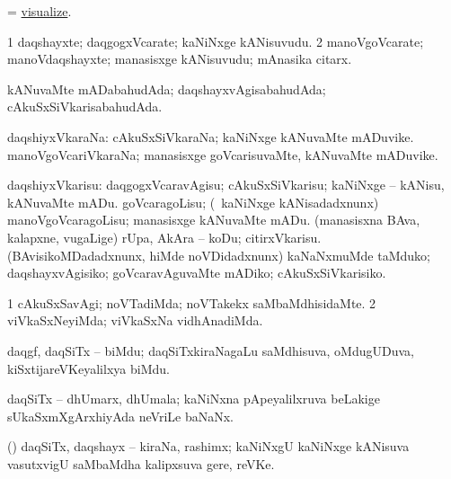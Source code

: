 \bentry 
{} 
\gl{\sakirx}
\expl{}
\bmng
 = \hyperlink{visualize}{visualize}. 
\emng
\eentry

\bentry
{} 
\gl{\nA}
\expl{}
\bmng
\bnum
\num{1} daqshayxte; daqgogxVcarate; kaNiNxge kANisuvudu. 
\num{2} manoVgoVcarate; manoVdaqshayxte; manasisxge kANisuvudu; mAnasika citarx. 
\enum
\emng
\eentry

\bentry
{} 
\gl{\gu}
\expl{}
\bmng
 kANuvaMte mADabahudAda; daqshayxvAgisabahudAda; cAkuSxSiVkarisabahudAda. 
\emng
\eentry

\bentry
{} 
\gl{\nA}
\expl{}
\bmng
 daqshiyxVkaraNa: 
\banum
{} cAkuSxSiVkaraNa; kaNiNxge kANuvaMte mADuvike. 
 manoVgoVcariVkaraNa; manasisxge goVcarisuvaMte, kANuvaMte mADuvike. 
\eanum
\emng
\eentry

\bentry 
{} 
\gl{\sakirx}
\expl{}
\bmng
 daqshiyxVkarisu: 
\banum
{} daqgogxVcaravAgisu; cAkuSxSiVkarisu; kaNiNxge -- kANisu, kANuvaMte mADu. 
 goVcaragoLisu; (\kanmu\ kaNiNxge kANisadadxnunx) manoVgoVcaragoLisu; manasisxge kANuvaMte mADu. 
 (manasisxna BAva, kalapxne, \mo vugaLige) rUpa, AkAra -- koDu; citirxVkarisu. 
 (BAvisikoMDadadxnunx, hiMde noVDidadxnunx) kaNaNxmuMde taMduko; daqshayxvAgisiko; goVcaravAguvaMte mADiko; cAkuSxSiVkarisiko. 
\eanum
\emng
\eentry

\bentry
{} 
\gl{\kirxvi}
\expl{}
\bmng
\bnum
\num{1} cAkuSxSavAgi; noVTadiMda; noVTakekx saMbaMdhisidaMte. 
\num{2} viVkaSxNeyiMda; viVkaSxNa vidhAnadiMda. 
\enum
\emng
\eentry

\bentry 
{}
\gl{\nA}
\expl{}
\bmng
 daqgf, daqSiTx -- biMdu; daqSiTxkiraNagaLu saMdhisuva, oMdugUDuva, kiSxtijareVKeyalilxya biMdu. 
\emng
\eentry

\bentry 
{}
\gl{\nA}
\expl{}
\bmng
 daqSiTx -- dhUmarx, dhUmala; kaNiNxna pApeyalilxruva beLakige sUkaSxmXgArxhiyAda neVriLe baNaNx. 
\emng
\eentry

\bentry 
{}
\gl{\nA}
\expl{}
\bmng
 (\daqvi) daqSiTx, daqshayx -- kiraNa, rashimx; kaNiNxgU kaNiNxge kANisuva vasutxvigU saMbaMdha kalipxsuva gere, reVKe. 
\emng
\eentry

